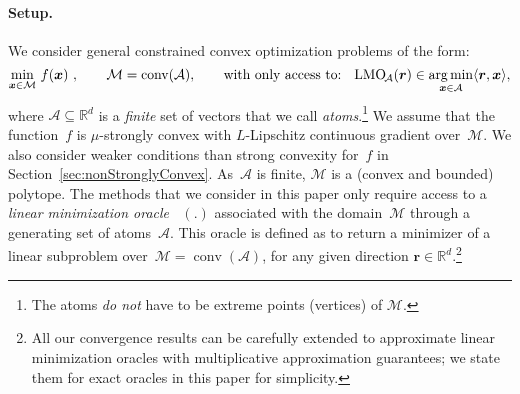\documentclass{article} %
\DeclareMathOperator*{\conv}{conv}
\DeclareMathOperator*{\argmin}{\arg\min}
\newcommand{\R}{\mathbb{R}}
\newcommand{\domain}{\mathcal{M}} %
\newcommand{\x}{\bm{x}}
\DeclareMathOperator*{\lmo}{LMO_{\!\Vertices}}
\newcommand{\Vertices}{\mathcal{A}} %
\renewcommand{\r}{\bm{r}}
\newcommand{\innerProdCompressed}[2]{\langle #1 , #2 \rangle}
\newcommand{\xdim}{d}  %
\newcommand{\0}{\mathbf{0}} %
\begin{document}
\paragraph{Setup.}
We consider general constrained convex optimization problems of the form:
\begin{equation}\label{eq:optGenConvex}
	\min_{\x \in \domain} \, f(\x) \ , \quad\quad  \domain = \conv({\Vertices}), 
	\qquad \text{with only access to: } \,\, \lmo(\r) \in  \argmin_{\x\in \Vertices} \innerProdCompressed{\r}{\x}  ,\vspace{-2mm}
\end{equation}
where $\Vertices \subseteq \R^{\xdim}$ is a \emph{finite} set of vectors that
we call \emph{atoms}.\footnote{The atoms \emph{do not} have to be extreme
points (vertices) of $\domain$.} 
We assume that the function~$f$ is
$\mu$-strongly convex with $L$-Lipschitz continuous gradient over~$\domain$. We also
consider weaker conditions than strong convexity for~$f$ in
Section~\ref{sec:nonStronglyConvex}.
As~$\Vertices$ is finite, $\domain$ is a
(convex and bounded) polytope. The methods that we consider in this paper
only require access to a \emph{linear minimization oracle} $\lmo(.)$
associated with the domain~$\domain$ through a generating set
of atoms~$\Vertices$.
This oracle is defined as to return a minimizer of a linear subproblem
over~$\domain=\conv(\Vertices)$,
for any given direction $\r \in \R^\xdim$.\footnote{%
All our convergence results can be carefully extended to approximate linear
minimization oracles with multiplicative approximation guarantees; we state
them for exact oracles in this paper for simplicity.%
}
\vspace{-3mm}
\end{document}
